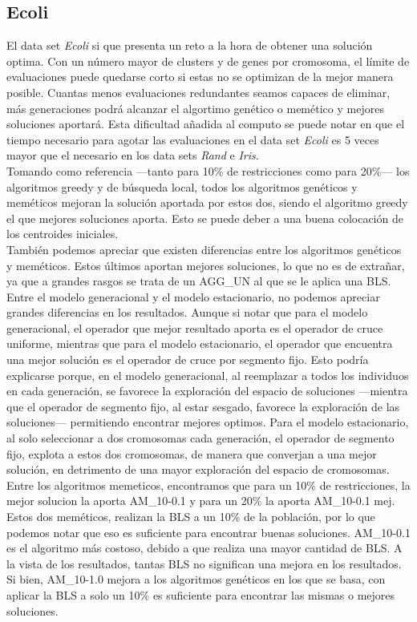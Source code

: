 \subsection{Ecoli}
El data set \emph{Ecoli} si que presenta un reto a la hora de obtener una solución optima. Con un número mayor de clusters y de genes por cromosoma, el límite de evaluaciones puede quedarse corto si estas no se optimizan de la mejor manera posible. Cuantas menos evaluaciones redundantes seamos capaces de eliminar, más generaciones podrá alcanzar el algortimo genético o memético y mejores soluciones aportará. Esta dificultad añadida al computo se puede notar en que el tiempo necesario para agotar las evaluaciones en el data set \emph{Ecoli} es 5 veces mayor que el necesario en los data sets \emph{Rand} e \emph{Iris}.
\\
Tomando como referencia ---tanto para 10\% de restricciones como para 20\%--- los algoritmos greedy y de búsqueda local, todos los algoritmos genéticos y meméticos mejoran la solución aportada por estos dos, siendo el algoritmo greedy el que mejores soluciones aporta. Esto se puede deber a una buena colocación de los centroides iniciales.
\\
También podemos apreciar que existen diferencias entre los algoritmos genéticos y meméticos. Estos últimos aportan mejores soluciones, lo que no es de extrañar, ya que a grandes rasgos se trata de un AGG\_UN al que se le aplica una BLS.
Entre el modelo generacional y el modelo estacionario, no podemos apreciar grandes diferencias en los resultados. Aunque si notar que para el modelo generacional, el operador que mejor resultado aporta es el operador de cruce uniforme, mientras que para el modelo estacionario, el operador que encuentra una mejor solución es el operador de cruce por segmento fijo.
Esto podría explicarse porque, en el modelo generacional, al reemplazar a todos los individuos en cada generación, se favorece la exploración del espacio de soluciones ---mientra que el operador de segmento fijo, al estar sesgado, favorece la exploración de las soluciones--- permitiendo encontrar mejores optimos. Para el modelo estacionario, al solo seleccionar a dos cromosomas cada generación, el operador de segmento fijo, explota a estos dos cromosomas, de manera que converjan a una mejor solución, en detrimento de una mayor exploración del espacio de cromosomas.
\\
Entre los algoritmos memeticos, encontramos que para un 10\% de restricciones, la mejor solucion la aporta AM\_10-0.1 y para un 20\% la aporta AM\_10-0.1 mej.
Estos dos meméticos, realizan la BLS a un 10\% de la población, por lo que podemos notar que eso es suficiente para encontrar buenas soluciones. AM\_10-0.1 es el algoritmo más costoso, debido a que realiza una mayor cantidad de BLS. A la vista de los resultados, tantas BLS no significan una mejora en los resultados. Si bien, AM\_10-1.0 mejora a los algoritmos genéticos en los que se basa, con aplicar la BLS a solo un 10\% es suficiente para encontrar las mismas o mejores soluciones.


